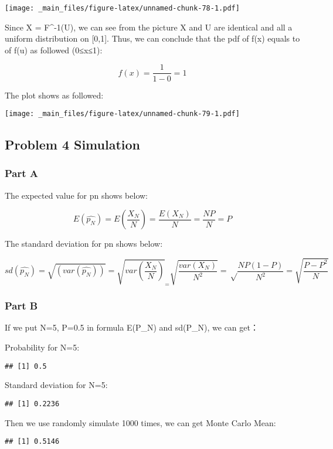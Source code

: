 \documentclass[
]{article}
\begin{document}
\texttt{[image: \_main\_files/figure-latex/unnamed-chunk-78-1.pdf]}

Since X = F\^{}-1(U), we can see from the picture X and U are identical and all a uniform distribution on {[}0,1{]}. Thus, we can conclude that the pdf of f(x) equals to of f(u) as followed (0≤x≤1):

\[
f(x) = \frac {1}{1-0} = 1 
\]

The plot shows as followed:

\texttt{[image: \_main\_files/figure-latex/unnamed-chunk-79-1.pdf]}

\hypertarget{problem-4-simulation}{%
\subsection{Problem 4 Simulation}\label{problem-4-simulation}}

\hypertarget{part-a-8}{%
\subsubsection{Part A}\label{part-a-8}}

The expected value for pn shows below:

\[
E(\hat{p_N}) = E(\frac{X_N}{N}) = \frac{E(X_N)}{N} = \frac{NP}{N} = P
\]

The standard deviation for pn shows below:

\[
sd(\hat{p_N}) = \sqrt {(var(\hat{p_N}))} = \sqrt {var(\frac{X_N}{N})}_ = \sqrt {\frac{var(X_N)}{N^2}} = \sqrt \frac{NP(1-P)}{N^2} = \sqrt{\frac {P-P^2}{N}}
\]

\hypertarget{part-b-8}{%
\subsubsection{Part B}\label{part-b-8}}

If we put N=5, P=0.5 in formula E(P\_N) and sd(P\_N), we can get：

Probability for N=5:

\begin{verbatim}
## [1] 0.5
\end{verbatim}

Standard deviation for N=5:

\begin{verbatim}
## [1] 0.2236
\end{verbatim}

Then we use randomly simulate 1000 times, we can get Monte Carlo Mean:

\begin{verbatim}
## [1] 0.5146
\end{verbatim}
\end{document}
